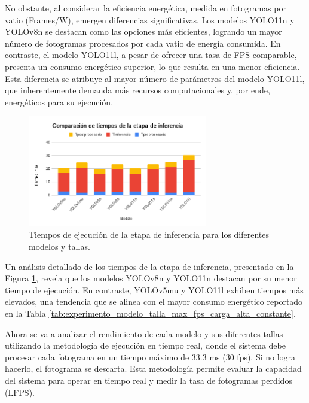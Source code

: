 \documentclass[11pt,spanish,listoffigures,listoftables]{tfgetsinf}
\begin{document}
No obstante, al considerar la eficiencia energética, medida en fotogramas por vatio (Frames/W), emergen diferencias significativas. Los modelos YOLO11n y YOLOv8n se destacan como las opciones más eficientes, logrando un mayor número de fotogramas procesados por cada vatio de energía consumida. En contraste, el modelo YOLO11l, a pesar de ofrecer una tasa de FPS comparable, presenta un consumo energético superior, lo que resulta en una menor eficiencia. Esta diferencia se atribuye al mayor número de parámetros del modelo YOLO11l, que inherentemente demanda más recursos computacionales y, por ende, energéticos para su ejecución.


\begin{figure}[H]
   \centering
   \includegraphics[width=0.7\textwidth]{images/analisis_de_la_solucion/modelo_talla/tiempos_inferencia.png}
   \caption[Tiempos de ejecución de la etapa de inferencia para los diferentes modelos y tallas]{Tiempos de ejecución de la etapa de inferencia para los diferentes modelos y tallas.}
   \label{fig:tiempos_inferencia}
\end{figure}
Un análisis detallado de los tiempos de la etapa de inferencia, presentado en la Figura \ref{fig:tiempos_inferencia}, revela que los modelos YOLOv8n y YOLO11n destacan por su menor tiempo de ejecución. En contraste, YOLOv5mu y YOLO11l exhiben tiempos más elevados, una tendencia que se alinea con el mayor consumo energético reportado en la Tabla \ref{tab:experimento_modelo_talla_max_fps_carga_alta_constante}.

Ahora se va a analizar el rendimiento de cada modelo y sus diferentes tallas utilizando la metodología de ejecución en tiempo real, donde el sistema debe procesar cada fotograma en un tiempo máximo de 33.3 ms (30 fps). Si no logra hacerlo, el fotograma se descarta. Esta metodología permite evaluar la capacidad del sistema para operar en tiempo real y medir la tasa de fotogramas perdidos (LFPS).
\end{document}

